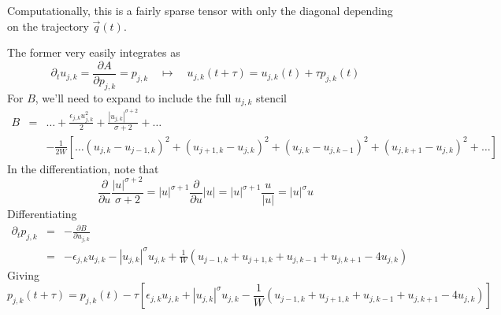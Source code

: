 \documentclass[12pt, a4paper, prl]{revtex4}
\newcommand{\abs}[1]{\left| #1 \right|}
\begin{document}
Computationally, this is a fairly sparse tensor with only the diagonal depending on the trajectory ${\vec q}(t)$. 






\newpage
The former very easily integrates as
\begin{equation*}
\partial_t u_{j,k} = \frac{\partial A}{\partial p_{j,k}} = p_{j,k} \quad \mapsto \quad u_{j,k}(t+\tau) = u_{j,k}(t) + \tau p_{j,k}(t)
\end{equation*}
For $B$, we'll need to expand to include the full $u_{j,k}$ stencil
\begin{eqnarray*}
B &=& \ldots + \frac{\epsilon_{j,k} u_{j,k}^2}{2} + \frac{\abs{u_{j,k}}^{\sigma + 2}}{\sigma + 2} + \ldots \\
&& - \frac{1}{2W}\left[ \ldots  \left(u_{j,k} - u_{j-1,k} \right)^2  + \left(u_{j+1,k} - u_{j,k} \right)^2 + \left(u_{j,k} - u_{j,k-1} \right)^2  + \left(u_{j,k+1} - u_{j,k} \right)^2 + \ldots \right]
\end{eqnarray*}
In the differentiation, note that 
\begin{equation*}
\frac{\partial}{\partial u}  \frac{\abs{u}^{\sigma + 2}}{\sigma + 2} = 
\abs{u}^{\sigma + 1} \frac{\partial}{\partial u} \abs{u} = \abs{u}^{\sigma + 1} \frac{u}{\abs{u}}
= \abs{u}^\sigma u 
\end{equation*}
Differentiating
\begin{eqnarray*}
\partial_t p_{j,k} &=& -\frac{\partial B}{\partial u_{j,k}} \\
 &=& - \epsilon_{j,k} u_{j,k} - \abs{u_{j,k}}^\sigma u_{j,k} + \frac{1}{W}\left( u_{j-1,k} + u_{j+1,k} + u_{j,k-1} + u_{j,k+1} - 4u_{j,k} \right) 
 \end{eqnarray*}
Giving
\begin{equation*}
p_{j,k}(t+\tau) = p_{j,k}(t) - \tau \left[ \epsilon_{j,k} u_{j,k} + \abs{u_{j,k}}^\sigma u_{j,k} - \frac{1}{W}\left( u_{j-1,k} + u_{j+1,k} + u_{j,k-1} + u_{j,k+1} - 4u_{j,k} \right) 
 \right]
\end{equation*}
\end{document}
